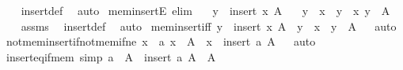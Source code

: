 \begin{isabellebody}
%
\isadelimproof
\ \ %
\endisadelimproof
%
\isatagproof
{}\isamarkupfalse%
\ insert{\isacharunderscore}{\kern0pt}def\ \isamarkupfalse%
\ auto%
\endisatagproof
{\isafoldproof}%
%
\isadelimproof
\isanewline
%
\endisadelimproof
\isanewline
{}\isamarkupfalse%
\ mem{\isacharunderscore}{\kern0pt}insertE\ {\isacharbrackleft}{\kern0pt}elim{\isacharbrackright}{\kern0pt}{\isacharcolon}{\kern0pt}\isanewline
\ \ \ {\isachardoublequoteopen}y\ {\isasymin}\ insert\ x\ A{\isachardoublequoteclose}\isanewline
\ \ \ {\isachardoublequoteopen}y\ {\isacharequal}{\kern0pt}\ x{\isachardoublequoteclose}\ {\isacharbar}{\kern0pt}\ {\isachardoublequoteopen}y\ {\isasymnoteq}\ x{\isachardoublequoteclose}\ {\isachardoublequoteopen}y\ {\isasymin}\ A{\isachardoublequoteclose}\isanewline
%
\isadelimproof
\ \ %
\endisadelimproof
%
\isatagproof
{}\isamarkupfalse%
\ assms\ \isamarkupfalse%
\ insert{\isacharunderscore}{\kern0pt}def\ \isamarkupfalse%
\ auto%
\endisatagproof
{\isafoldproof}%
%
\isadelimproof
\isanewline
%
\endisadelimproof
\isanewline
{}\isamarkupfalse%
\ mem{\isacharunderscore}{\kern0pt}insert{\isacharunderscore}{\kern0pt}iff{\isacharcolon}{\kern0pt}\ {\isachardoublequoteopen}y\ {\isasymin}\ insert\ x\ A\ {\isasymlongleftrightarrow}\ y\ {\isacharequal}{\kern0pt}\ x\ {\isasymor}\ y\ {\isasymin}\ A{\isachardoublequoteclose}%
\isadelimproof
\ %
\endisadelimproof
%
\isatagproof
{}\isamarkupfalse%
\ auto%
\endisatagproof
{\isafoldproof}%
%
\isadelimproof
%
\endisadelimproof
\isanewline
\isanewline
{}\isamarkupfalse%
\ not{\isacharunderscore}{\kern0pt}mem{\isacharunderscore}{\kern0pt}insert{\isacharunderscore}{\kern0pt}if{\isacharunderscore}{\kern0pt}not{\isacharunderscore}{\kern0pt}mem{\isacharunderscore}{\kern0pt}if{\isacharunderscore}{\kern0pt}ne{\isacharcolon}{\kern0pt}\ {\isachardoublequoteopen}{\isasymlbrakk}x\ {\isasymnoteq}\ a{\isacharsemicolon}{\kern0pt}\ x\ {\isasymnotin}\ A{\isasymrbrakk}\ {\isasymLongrightarrow}\ x\ {\isasymnotin}\ insert\ a\ A{\isachardoublequoteclose}%
\isadelimproof
\ %
\endisadelimproof
%
\isatagproof
{}\isamarkupfalse%
\ auto%
\endisatagproof
{\isafoldproof}%
%
\isadelimproof
%
\endisadelimproof
\isanewline
\isanewline
{}\isamarkupfalse%
\ insert{\isacharunderscore}{\kern0pt}eq{\isacharunderscore}{\kern0pt}if{\isacharunderscore}{\kern0pt}mem\ {\isacharbrackleft}{\kern0pt}simp{\isacharbrackright}{\kern0pt}{\isacharcolon}{\kern0pt}\ {\isachardoublequoteopen}a\ {\isasymin}\ A\ {\isasymLongrightarrow}\ insert\ a\ A\ {\isacharequal}{\kern0pt}\ A{\isachardoublequoteclose}%

\end{isabellebody}
